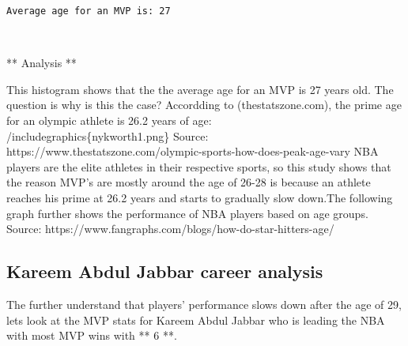 \documentclass[11pt]{article}
\begin{document}
    \begin{Verbatim}[commandchars=\\\{\}]
 Average age for an MVP is: 27

    \end{Verbatim}

    \begin{center}
    \end{center}
    { \hspace*{\fill} \\}
    
    ** Analysis **

This histogram shows that the the average age for an MVP is 27 years
old. The question is why is this the case? Accordding to
(thestatszone.com), the prime age for an olympic athlete is 26.2 years
of age:\\
/includegraphics\{nykworth1.png\} Source:
https://www.thestatszone.com/olympic-sports-how-does-peak-age-vary NBA
players are the elite athletes in their respective sports, so this study
shows that the reason MVP's are mostly around the age of 26-28 is
because an athlete reaches his prime at 26.2 years and starts to
gradually slow down.The following graph further shows the performance of
NBA players based on age groups. Source:
https://www.fangraphs.com/blogs/how-do-star-hitters-age/

\subsection{Kareem Abdul Jabbar career
analysis}\label{kareem-abdul-jabbar-career-analysis}

The further understand that players' performance slows down after the
age of 29, lets look at the MVP stats for Kareem Abdul Jabbar who is
leading the NBA with most MVP wins with ** 6 **.
\end{document}

